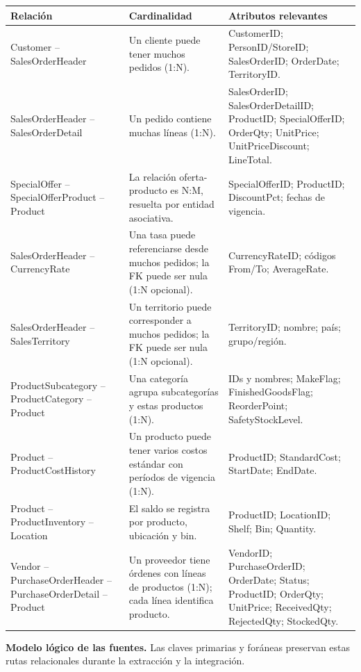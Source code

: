 \documentclass[10pt,a4paper]{article}
\begin{document}
\small
\begin{longtable}{p{}p{}p{}}
\toprule
\textbf{Relación} & \textbf{Cardinalidad} & \textbf{Atributos relevantes}\\
\midrule
\endhead
Customer -- SalesOrderHeader & Un cliente puede tener muchos pedidos (1:N). &
CustomerID; PersonID/StoreID; SalesOrderID; OrderDate; TerritoryID.\\
SalesOrderHeader -- SalesOrderDetail & Un pedido contiene muchas líneas (1:N). &
SalesOrderID; SalesOrderDetailID; ProductID; SpecialOfferID; OrderQty;
UnitPrice; UnitPriceDiscount; LineTotal.\\
SpecialOffer -- SpecialOfferProduct -- Product & La relación oferta-producto
es N:M, resuelta por entidad asociativa. & SpecialOfferID; ProductID;
DiscountPct; fechas de vigencia.\\
SalesOrderHeader -- CurrencyRate & Una tasa puede referenciarse desde muchos
pedidos; la FK puede ser nula (1:N opcional). & CurrencyRateID; códigos From/To;
AverageRate.\\
SalesOrderHeader -- SalesTerritory & Un territorio puede corresponder a
muchos pedidos; la FK puede ser nula (1:N opcional). & TerritoryID; nombre;
país; grupo/región.\\
ProductSubcategory -- ProductCategory -- Product & Una categoría agrupa
subcategorías y estas productos (1:N). & IDs y nombres; MakeFlag;
FinishedGoodsFlag; ReorderPoint; SafetyStockLevel.\\
Product -- ProductCostHistory & Un producto puede tener varios costos
estándar con períodos de vigencia (1:N). & ProductID; StandardCost; StartDate;
EndDate.\\
Product -- ProductInventory -- Location & El saldo se registra por producto,
ubicación y bin. & ProductID; LocationID; Shelf; Bin; Quantity.\\
Vendor -- PurchaseOrderHeader -- PurchaseOrderDetail -- Product & Un proveedor
tiene órdenes con líneas de productos (1:N); cada línea identifica producto. &
VendorID; PurchaseOrderID; OrderDate; Status; ProductID; OrderQty; UnitPrice;
ReceivedQty; RejectedQty; StockedQty.\\
\bottomrule
\end{longtable}
\normalsize

\textbf{Modelo lógico de las fuentes.} Las claves primarias y foráneas
preservan estas rutas relacionales durante la extracción y la integración.
\end{document}
